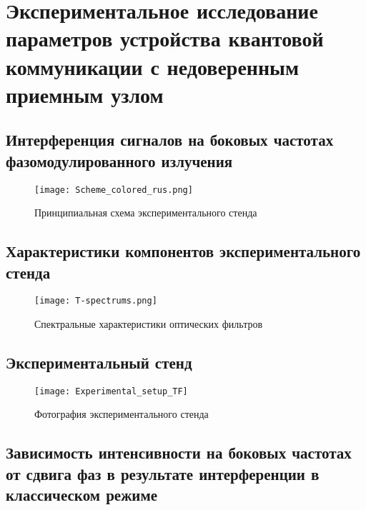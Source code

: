 \chapter{Экспериментальное исследование параметров устройства квантовой коммуникации с недоверенным приемным узлом} \label{ch:ch5}
\section{Интерференция сигналов на боковых частотах фазомодулированного излучения} \label{sec:ch5/sec1}


 \begin{figure}[ht]
  \centering
  \texttt{[image: Scheme\_colored\_rus.png]}
  \caption{Принципиальная схема экспериментального стенда}
  \label{fig:RF_sin}
\end{figure}

\pagebreak

\section{Характеристики компонентов экспериментального стенда} \label{ch:ch5/sec2}

 \begin{figure}[ht]
  \centering
  \texttt{[image: T-spectrums.png]}
  \caption{Спектральные характеристики оптических фильтров}
  \label{fig:Spectrums}
\end{figure}

\pagebreak

\section{Экспериментальный стенд} \label{ch:ch5/sec3}

 \begin{figure}[ht]
  \centering
	 \texttt{[image: Experimental\_setup\_TF]}
  \caption{Фотография экспериментального стенда}
  \label{fig:experimental_setup_TF}
\end{figure}

\pagebreak

\section{Зависимость интенсивности на боковых частотах от сдвига фаз в результате интерференции в классическом режиме} \label{ch:ch5/sec4}

